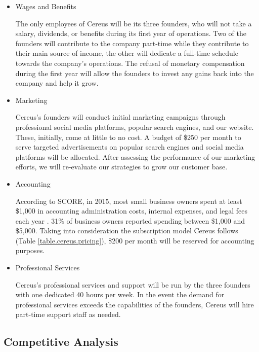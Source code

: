 \begin{itemize}

\item Wages and Benefits

The only employees of Cereus will be its three founders, who will not take a salary, dividends, or benefits during its first year of operations. Two of the founders will contribute to the company part-time while they contribute to their main source of income, the other will dedicate a full-time schedule towards the company's operations. The refusal of monetary compensation during the first year will allow the founders to invest any gains back into the company and help it grow.

\item Marketing

Cereus's founders will conduct initial marketing campaigns through professional social media platforms, popular search engines, and our website. These, initially, come at little to no cost. A budget of \$250 per month to serve targeted advertisements on popular search engines and social media platforms will be allocated. After assessing the performance of our marketing efforts, we will re-evaluate our strategies to grow our customer base.

\item Accounting

According to SCORE, in 2015, most small business owners spent at least \$1,000 in accounting administration costs, internal expenses, and legal fees each year \cite{score.2016}. 31\% of business owners reported spending between \$1,000 and \$5,000. Taking into consideration the subscription model Cereus follows (Table \ref{table.cereus.pricing}), \$200 per month will be reserved for accounting purposes.

\item Professional Services

Cereus's professional services and support will be run by the three founders with one dedicated 40 hours per week. In the event the demand for professional services exceeds the capabilities of the founders, Cereus will hire part-time support staff as needed.

\end{itemize}

\subsection{Competitive Analysis} \label{competitive.analysis}

